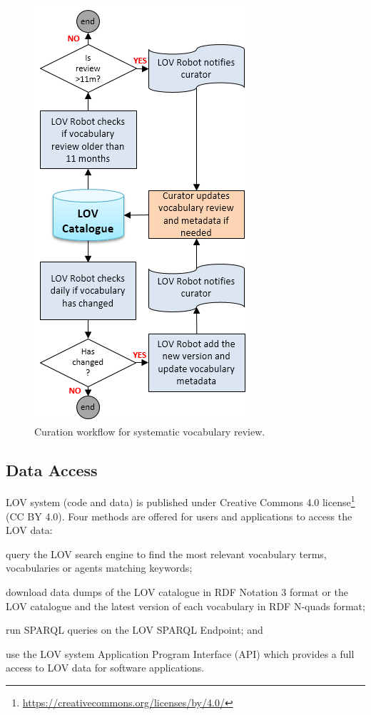 \documentclass{iosart2c}
\begin{document}
\begin{figure}[ht!b]
\includegraphics[scale=0.6]{workflow-curation-review.png}
\caption{Curation workflow for systematic vocabulary review.}
\label{fig:arch}
\end{figure}

\subsection{Data Access}

LOV system (code and data) is published under Creative Commons 4.0 license\footnote{\url{https://creativecommons.org/licenses/by/4.0/}} (CC BY 4.0). Four methods are offered for users and applications to access the LOV data:
		\begin{inparaenum}[1)] 
			\item query the LOV search engine to find the most relevant vocabulary terms, vocabularies or agents matching keywords;
			\item download data dumps of the LOV catalogue in RDF Notation 3 format or the LOV catalogue and the latest version of each vocabulary in RDF N-quads format;
			\item run SPARQL queries on the LOV SPARQL Endpoint; and
			\item use the LOV system Application Program Interface (API) which provides a full access to LOV data for software applications.
		\end{inparaenum}
\end{document}
